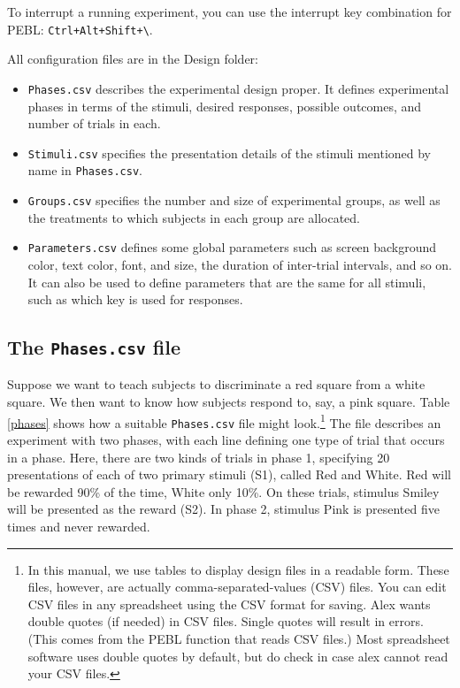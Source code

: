 \documentclass[11pt,]{article}
\begin{document}
To interrupt a running experiment, you can use the interrupt key
combination for PEBL: \texttt{Ctrl+Alt+Shift+\textbackslash{}}.


All configuration files are in the Design folder:

\begin{itemize}
\item
  \texttt{Phases.csv} describes the experimental design proper. It
  defines experimental phases in terms of the stimuli, desired
  responses, possible outcomes, and number of trials in each.
\item
  \texttt{Stimuli.csv} specifies the presentation details of the stimuli
  mentioned by name in \texttt{Phases.csv}.
\item
  \texttt{Groups.csv} specifies the number and size of experimental
  groups, as well as the treatments to which subjects in each group are
  allocated.
\item
  \texttt{Parameters.csv} defines some global parameters such as screen
  background color, text color, font, and size, the duration of
  inter-trial intervals, and so on. It can also be used to define
  parameters that are the same for all stimuli, such as which key is
  used for responses.
\end{itemize}

\subsection{The \texttt{Phases.csv} file}\label{the-phases.csv-file}

Suppose we want to teach subjects to discriminate a red square from a
white square. We then want to know how subjects respond to, say, a pink
square. Table \ref{phases} shows how a suitable \texttt{Phases.csv} file
might look.\footnote{In this manual, we use tables to display design
  files in a readable form. These files, however, are actually
  comma-separated-values (CSV) files. You can edit CSV files in any
  spreadsheet using the CSV format for saving. Alex wants double quotes
  (if needed) in CSV files. Single quotes will result in errors. (This
  comes from the PEBL function that reads CSV files.) Most spreadsheet
  software uses double quotes by default, but do check in case alex
  cannot read your CSV files.} The file describes an experiment with two
phases, with each line defining one type of trial that occurs in a
phase. Here, there are two kinds of trials in phase 1, specifying 20
presentations of each of two primary stimuli (S1), called Red and White.
Red will be rewarded 90\% of the time, White only 10\%. On these trials,
stimulus Smiley will be presented as the reward (S2). In phase 2,
stimulus Pink is presented five times and never rewarded.
\end{document}

